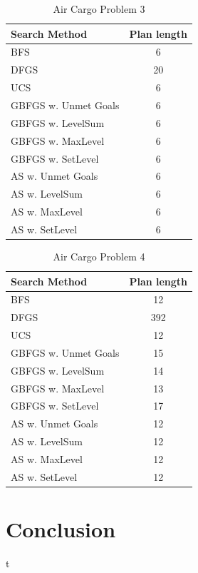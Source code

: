 \documentclass[a4paper]{article}
\begin{document}
    
\begin{table}[htpb]
    \caption{Air Cargo Problem 3}
    \centering
    \begin{tabular}{ l | c }
    Search Method & Plan length \\ \hline 
BFS & 6 \\
DFGS & 20 \\
UCS & 6 \\
GBFGS w. Unmet Goals & 6 \\
GBFGS w. LevelSum & 6 \\
GBFGS w. MaxLevel & 6 \\
GBFGS w. SetLevel & 6 \\
AS w. Unmet Goals & 6 \\
AS w. LevelSum & 6 \\
AS w. MaxLevel & 6 \\
AS w. SetLevel & 6
\end{tabular}
    \label{airps3}
    \end{table}

    
\begin{table}[htpb]
    \caption{Air Cargo Problem 4}
    \centering
    \begin{tabular}{ l | c }
    Search Method & Plan length \\ \hline 
BFS & 12 \\
DFGS & 392 \\
UCS & 12 \\
GBFGS w. Unmet Goals & 15 \\
GBFGS w. LevelSum & 14 \\
GBFGS w. MaxLevel & 13 \\
GBFGS w. SetLevel & 17 \\
AS w. Unmet Goals & 12 \\
AS w. LevelSum & 12 \\
AS w. MaxLevel & 12 \\
AS w. SetLevel & 12
\end{tabular}
    \label{airps4}
    \end{table}

\newpage

\section{Conclusion}
t



\end{document}
